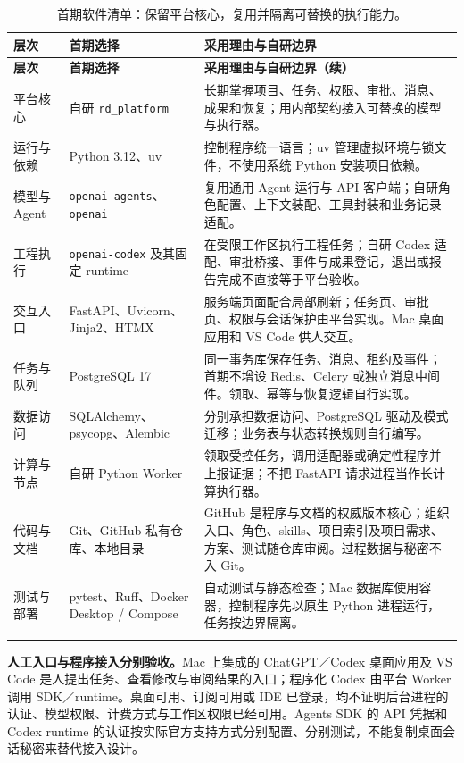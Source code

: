 \documentclass[11pt,a4paper]{article}
\begin{document}
\begingroup\small\renewcommand{\arraystretch}{1.16}
\begin{longtable}{P{2.0cm}P{3.75cm}P{9.0cm}}
\toprule
\textbf{层次} & \textbf{首期选择} & \textbf{采用理由与自研边界}\\
\midrule
\endfirsthead
\toprule
\textbf{层次} & \textbf{首期选择} & \textbf{采用理由与自研边界（续）}\\
\midrule
\endhead
\bottomrule
\endfoot
\endlastfoot
平台核心 & 自研 \texttt{rd\_platform} & 长期掌握项目、任务、权限、审批、消息、成果和恢复；用内部契约接入可替换的模型与执行器。\\
运行与依赖 & Python 3.12、uv & 控制程序统一语言；uv 管理虚拟环境与锁文件，不使用系统 Python 安装项目依赖。\\
模型与 Agent & \texttt{openai-agents}、\texttt{openai} & 复用通用 Agent 运行与 API 客户端；自研角色配置、上下文装配、工具封装和业务记录适配。\\
工程执行 & \texttt{openai-codex} 及其固定 runtime & 在受限工作区执行工程任务；自研 Codex 适配、审批桥接、事件与成果登记，退出或报告完成不直接等于平台验收。\\
交互入口 & FastAPI、Uvicorn、Jinja2、HTMX & 服务端页面配合局部刷新；任务页、审批页、权限与会话保护由平台实现。Mac 桌面应用和 VS Code 供人交互。\\
任务与队列 & PostgreSQL 17 & 同一事务库保存任务、消息、租约及事件；首期不增设 Redis、Celery 或独立消息中间件。领取、幂等与恢复逻辑自行实现。\\
数据访问 & SQLAlchemy、psycopg、Alembic & 分别承担数据访问、PostgreSQL 驱动及模式迁移；业务表与状态转换规则自行编写。\\
计算与节点 & 自研 Python Worker & 领取受控任务，调用适配器或确定性程序并上报证据；不把 FastAPI 请求进程当作长计算执行器。\\*
代码与文档 & Git、GitHub 私有仓库、本地目录 & GitHub 是程序与文档的权威版本核心；组织入口、角色、skills、项目索引及项目需求、方案、测试随仓库审阅。过程数据与秘密不入 Git。\\*
测试与部署 & pytest、Ruff、Docker Desktop / Compose & 自动测试与静态检查；Mac 数据库使用容器，控制程序先以原生 Python 进程运行，任务按边界隔离。\\
\bottomrule
\caption{首期软件清单：保留平台核心，复用并隔离可替换的执行能力。}
\end{longtable}
\endgroup

\textbf{人工入口与程序接入分别验收。}Mac 上集成的 ChatGPT／Codex 桌面应用及 VS Code 是人提出任务、查看修改与审阅结果的入口；程序化 Codex 由平台 Worker 调用 SDK／runtime。桌面可用、订阅可用或 IDE 已登录，均不证明后台进程的认证、模型权限、计费方式与工作区权限已经可用。Agents SDK 的 API 凭据和 Codex runtime 的认证按实际官方支持方式分别配置、分别测试，不能复制桌面会话秘密来替代接入设计。\cite{v121-codex-auth}
\end{document}
